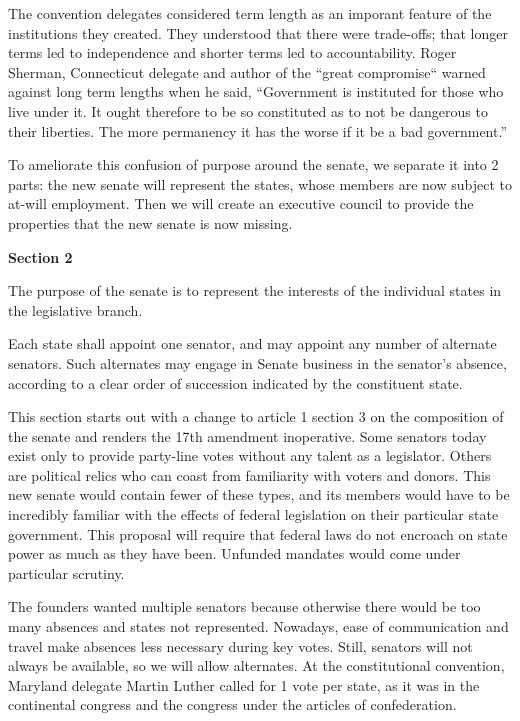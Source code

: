 \documentclass{article}
\begin{document}
The convention delegates considered term length as an imporant feature of the institutions they created. They understood that there were trade-offs; that longer terms led to independence and shorter terms led to accountability. Roger Sherman, Connecticut delegate and author of the “great compromise“ warned against long term lengths when he said, “Government is instituted for those who live under it. It ought therefore to be so constituted as to not be dangerous to their liberties. The more permanency it has the worse if it be a bad government.”\cite{Madison}

To ameliorate this confusion of purpose around the senate, we separate it into 2 parts: the new senate will represent the states, whose members are now subject to at-will employment.  Then we will create an executive council to provide the properties that the new senate is now missing.

\begin{quoting}
\textbf{Section 2}

The purpose of the senate is to represent the interests of the individual states in the legislative branch.

Each state shall appoint one senator, and may appoint any number of alternate senators. Such alternates may engage in Senate business in the senator’s absence, according to a clear order of succession indicated by the constituent state.
\end{quoting}

This section starts out with a change to article 1 section 3 on the composition of the senate and renders the 17th amendment inoperative. Some senators today exist only to provide party-line votes without any talent as a legislator. Others are political relics who can coast from familiarity with voters and donors. This new senate would contain fewer of these types, and its members would have to be incredibly familiar with the effects of federal legislation on their particular state government. This proposal will require that federal laws do not encroach on state power as much as they have been. Unfunded mandates would come under particular scrutiny.

The founders wanted multiple senators because otherwise there would be too many absences and states not represented. Nowadays, ease of communication and travel make absences less necessary during key votes. Still, senators will not always be available, so we will allow alternates. At the constitutional convention, Maryland delegate Martin Luther called for 1 vote per state, as it was in the continental congress and the congress under the articles of confederation\cite{Senate}.
\end{document}
